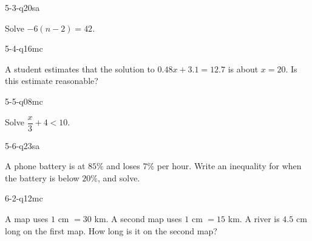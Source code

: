\begin{practiceQuestion}{5-3-q20}{sa}
\begin{questionText}
Solve $-6(n - 2) = 42$.
\end{questionText}
\end{practiceQuestion}

\begin{practiceQuestion}{5-4-q16}{mc}
\begin{questionText}
A student estimates that the solution to $0.48x + 3.1 = 12.7$ is about $x = 20$. Is this estimate reasonable?
\end{questionText}
\end{practiceQuestion}

\begin{practiceQuestion}{5-5-q08}{mc}
\begin{questionText}
Solve $\dfrac{x}{3} + 4 < 10$.
\end{questionText}
\end{practiceQuestion}

\begin{practiceQuestion}{5-6-q23}{sa}
\begin{questionText}
A phone battery is at $85\%$ and loses $7\%$ per hour. Write an inequality for when the battery is below $20\%$, and solve.
\end{questionText}
\end{practiceQuestion}

\begin{practiceQuestion}{6-2-q12}{mc}
\begin{questionText}
A map uses $1$ cm $= 30$ km. A second map uses $1$ cm $= 15$ km. A river is $4.5$ cm long on the first map. How long is it on the second map?
\end{questionText}
\end{practiceQuestion}

